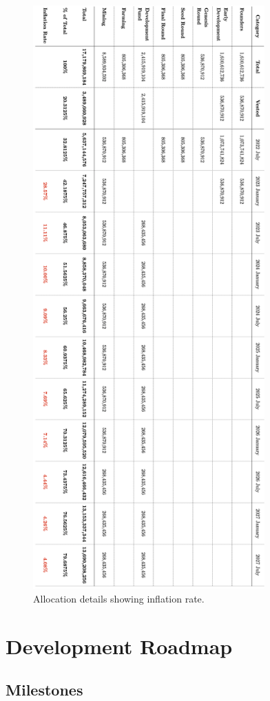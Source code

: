\documentclass[12pt]{article}
\begin{document}
\begin{figure}[H]
\centering
  \includegraphics[width=3.5in]{images/Blocktree_Allocation_Table_2.png}
  \caption{Allocation details showing inflation rate.}
  \label{fig:allocation_table2}
\end{figure}


  
\section{Development Roadmap}


\subsection{Milestones}
\end{document}

